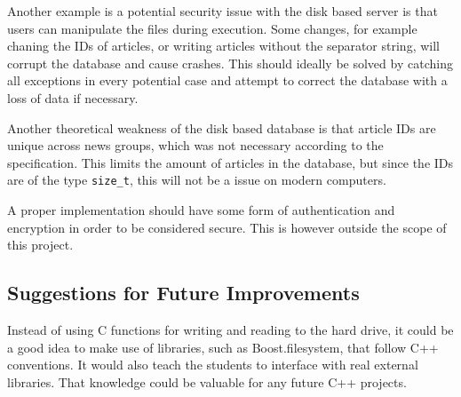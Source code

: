 \documentclass{acmsiggraph}               %
\begin{document}
Another example is a potential security issue with the disk based server
is that users can manipulate the files during execution. Some changes, for example 
chaning the IDs of articles, or writing articles without the separator string, will
corrupt the database and cause crashes. This should ideally be solved by catching
all exceptions in every potential case and attempt to correct the database with a
loss of data if necessary. 

Another theoretical weakness of the disk based database is that article IDs are unique
across news groups, which was not necessary according to the specification. This
limits the amount of articles in the database, but since the IDs are of
the type \texttt{size\_t}, this will not be a issue on modern computers.

A proper implementation should have some form of authentication and encryption 
in order to be considered secure. This is however outside the scope of this project.

\subsection{Suggestions for Future Improvements}
Instead of using C functions for writing and reading to the hard drive, it could
be a good idea to make use of libraries, such as Boost.filesystem, that follow C++ 
conventions. It would also teach the students to interface with real external libraries. 
That knowledge could be valuable for any future C++ projects.
\end{document}
